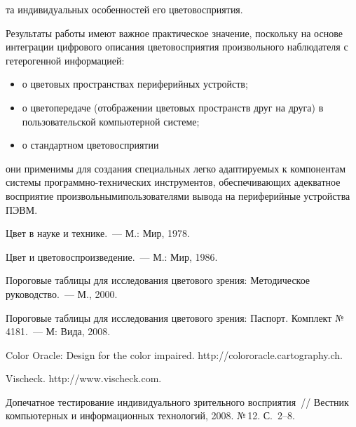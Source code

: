 \begin{multicols}{2}

\noindent
та индивидуальных 
особенностей его цветовосприятия.


  
  Результаты работы имеют важное практическое значение, поскольку на 
основе интеграции цифрового описания цветовосприятия произвольного 
наблюдателя с гетерогенной информацией:
  \begin{itemize}
  \item о цветовых пространствах периферийных устройств;
  \item о цветопередаче (отображении цветовых пространств друг на друга) в 
пользовательской компьютерной сис\-теме;
  \item о стандартном цветовосприятии
  \end{itemize}
они применимы для создания специальных легко адаптируемых к компонентам 
системы прог\-рам\-мно-тех\-ни\-че\-ских инструментов, обес\-пе\-чи\-ва\-ющих 
адекватное восприятие произвольными\linebreak пользователями вывода на 
периферийные устройства ПЭВМ. 

\vspace*{-6pt}

{\small\frenchspacing
{%
\begin{thebibliography}{99}


  Цвет в науке и технике.~--- М.: Мир, 1978.
  
  Цвет и цветовоспроизведение.~--- М.: Мир, 1986.
  
  Пороговые таблицы для исследования цветового зрения: Методическое 
руководство.~--- М., 2000. 
  
  Пороговые таблицы для исследования цветового зрения: Паспорт. Комплект 
№\,4181.~--- М: Вида, 2008.
  
  
  Color Oracle: Design for the color impaired. {\sf 
http://colororacle.cartography.ch}.
  
  Vischeck. {\sf http://www.vischeck.com}.
  
  Допечатное тестирование индивидуального зрительного восприятия~// 
Вестник компьютерных и информационных технологий, 2008. №\,12. С.~2--8.
  

\end{thebibliography}}}
\end{multicols}
